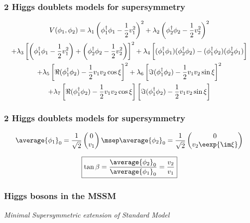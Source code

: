 \begin{frame}
\frametitle{2 Higgs doublets models for supersymmetry}
\begin{multline*}
V(\phi_1,\phi_2)
= \lambda_1 \left(\phi_1^\dagger\phi_1 - \frac{1}{2} v_1^2\right)^2
+ \lambda_2 \left(\phi_2^\dagger\phi_2 - \frac{1}{2} v_2^2\right)^2
\\
+ \lambda_3 \left[ \left(\phi_1^\dagger\phi_1 - \frac{1}{2} v_1^2\right) + \left(\phi_2^\dagger\phi_2 - \frac{1}{2} v_2^2\right) \right]^2
+ \lambda_4 \left[ (\phi_1^\dagger\phi_1)(\phi_2^\dagger\phi_2) - (\phi_1^\dagger\phi_2)(\phi_2^\dagger\phi_1) \vphantom{\frac{1}{2}}\right]
\\
+ \lambda_5 \left[ \Re(\phi_1^\dagger\phi_2) - \frac{1}{2} v_1v_2\cos\xi \right]^2
+ \lambda_6 \left[ \Im(\phi_1^\dagger\phi_2) - \frac{1}{2} v_1v_2\sin\xi \right]^2
\\
+ \lambda_7 \left[ \Re(\phi_1^\dagger\phi_2) - \frac{1}{2} v_1v_2\cos\xi \right]\left[ \Im(\phi_1^\dagger\phi_2) - \frac{1}{2} v_1v_2\sin\xi \right]
\end{multline*}
\end{frame}

\begin{frame}
\frametitle{2 Higgs doublets models for supersymmetry}
\begin{equation*}
\average{\phi_1}_0 = \frac{1}{\sqrt{2}} \begin{pmatrix}
0\\v_1
\end{pmatrix}
\msep
\average{\phi_2}_0 = \frac{1}{\sqrt{2}} \begin{pmatrix}
0\\v_2 \eexp{\im\xi}
\end{pmatrix}
\end{equation*}

\begin{equation*}
\boxed{\tan\beta = \frac{\average{\phi_2}_0}{\average{\phi_1}_0} = \frac{v_2}{v_1}}
\end{equation*}
\end{frame}

\begin{frame}
\frametitle{Higgs bosons in the MSSM}
\begin{center}
\emph{Minimal Supersymmetric extension of Standard Model}

\vspace{2\baselineskip}
\end{center}
\end{frame}


